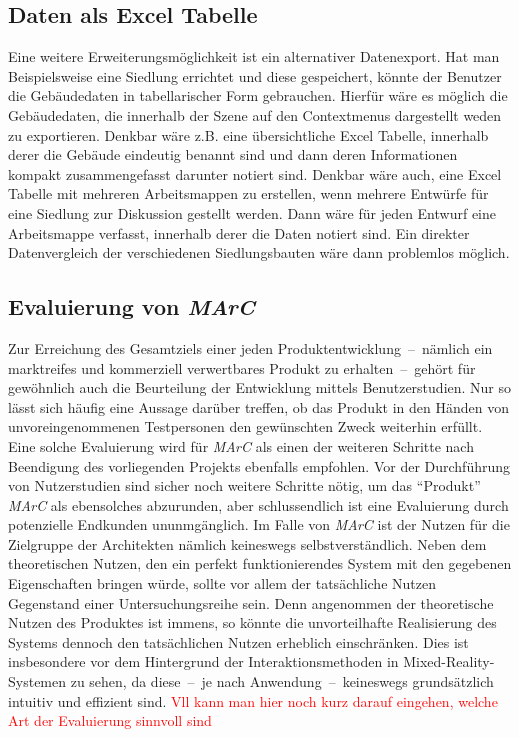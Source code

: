 \subsection{Daten als Excel Tabelle}
Eine weitere Erweiterungsmöglichkeit ist ein alternativer Datenexport. Hat man Beispielsweise eine Siedlung errichtet und diese gespeichert, könnte der Benutzer die Gebäudedaten in tabellarischer Form gebrauchen. Hierfür wäre es möglich die Gebäudedaten, die innerhalb der Szene auf den Contextmenus dargestellt weden zu exportieren. Denkbar wäre z.B. eine übersichtliche Excel Tabelle, innerhalb derer die Gebäude eindeutig benannt sind und dann deren Informationen kompakt zusammengefasst darunter notiert sind. Denkbar wäre auch, eine Excel Tabelle mit mehreren Arbeitsmappen zu erstellen, wenn mehrere Entwürfe für eine Siedlung zur Diskussion gestellt werden. Dann wäre für jeden Entwurf eine Arbeitsmappe verfasst, innerhalb derer die Daten notiert sind. Ein direkter Datenvergleich der verschiedenen Siedlungsbauten wäre dann problemlos möglich.

\subsection{Evaluierung von \emph{MArC}}
Zur Erreichung des Gesamtziels einer jeden Produktentwicklung~--~nämlich ein markt\-rei\-fes und kommerziell verwertbares Produkt zu erhalten~--~gehört für gewöhnlich auch die Beurteilung der Entwicklung mittels Benutzerstudien. Nur so lässt sich häufig eine Aussage darüber treffen, ob das Produkt in den Händen von unvoreingenommenen Testpersonen den gewünschten Zweck weiterhin erfüllt.\\
Eine solche Evaluierung wird für \emph{MArC} als einen der weiteren Schritte nach Beendigung des vorliegenden Projekts ebenfalls empfohlen. Vor der Durchführung von Nutzerstudien sind sicher noch weitere Schritte nötig, um das "`Produkt"' \emph{MArC} als ebensolches abzurunden, aber schlussendlich ist eine Evaluierung durch potenzielle Endkunden ununmgänglich. Im Falle von \emph{MArC} ist der Nutzen für die Zielgruppe der Architekten nämlich keineswegs selbstverständlich. Neben dem theoretischen Nutzen, den ein perfekt funktionierendes System mit den gegebenen Eigenschaften bringen würde, sollte vor allem der tatsächliche Nutzen Gegenstand einer Untersuchungsreihe sein. Denn angenommen der theoretische Nutzen des Produktes ist immens, so könnte die unvorteilhafte Realisierung des Systems dennoch den tatsächlichen Nutzen erheblich einschränken. Dies ist insbesondere vor dem Hintergrund der Interaktionsmethoden in Mixed-Reality-Systemen zu sehen, da diese~--~je nach Anwendung~--~keineswegs grundsätzlich intuitiv und effizient sind. \textcolor{red}{Vll kann man hier noch kurz darauf eingehen, welche Art der Evaluierung sinnvoll sind } 